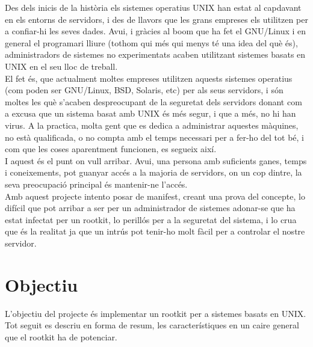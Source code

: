 Des dels inicis de la història els sistemes operatius UNIX han estat al capdavant en els
entorns de servidors, i des de llavors que les grans empreses els utilitzen per a confiar-hi
les seves dades. Avui, i gràcies al boom que ha fet el GNU/Linux i en general el programari lliure (tothom qui més qui
menys té una idea del què és), administradors de sistemes no experimentats acaben
utilitzant sistemes basats en UNIX en el seu lloc de treball. \\
El fet és, que actualment moltes empreses utilitzen aquests sistemes operatius (com poden ser
GNU/Linux, BSD, Solaris, etc) per als seus servidors, i són moltes les què s'acaben despreocupant
de la seguretat dels servidors donant com a excusa que un sistema basat amb UNIX és
més segur, i que a més, no hi han virus. A la practica, molta gent que es dedica a
administrar aquestes màquines, no està qualificada, o no compta amb el temps necessari
per a fer-ho del tot bé, i com que les coses aparentment funcionen, es segueix així. \\

I aquest és el punt on vull arribar. Avui, una persona amb suficients ganes, temps i
coneixements, pot guanyar accés a la majoria de servidors, on un cop dintre, la seva
preocupació principal és mantenir-ne l'accés.\\

Amb aquest projecte intento posar de manifest, creant una prova del concepte, lo difícil
que pot arribar a ser per un administrador de sistemes adonar-se que ha estat infectat per
un rootkit, lo perillós per a la seguretat del sistema, i lo crua que és la realitat ja que un
intrús pot tenir-ho molt fàcil per a controlar el nostre servidor.

\section{Objectiu}

L'objectiu del projecte és implementar un rootkit per a sistemes basats en UNIX. Tot seguit
es descriu en forma de resum, les característiques en un caire general que el rootkit ha de potenciar. 

